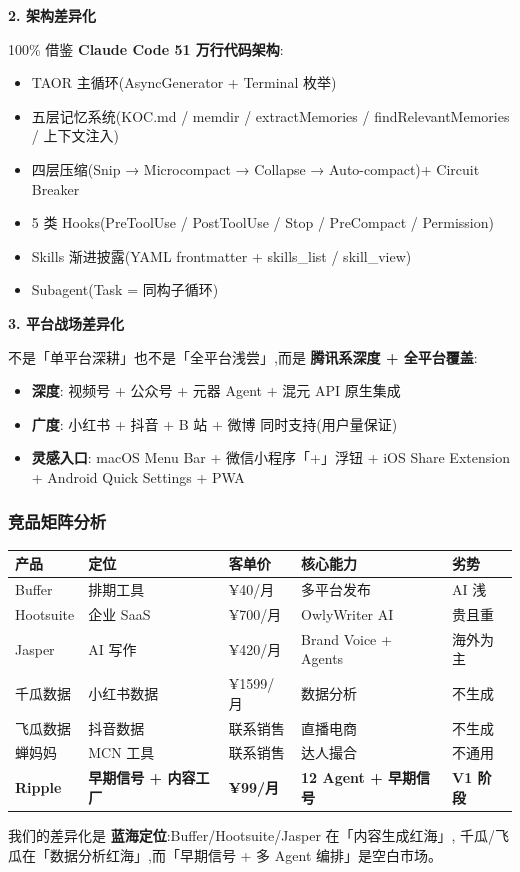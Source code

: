 \textbf{2. 架构差异化}

100\% 借鉴 \textbf{Claude Code 51 万行代码架构}:
\begin{itemize}
\item TAOR 主循环(AsyncGenerator + Terminal 枚举)
\item 五层记忆系统(KOC.md / memdir / extractMemories / findRelevantMemories / 上下文注入)
\item 四层压缩(Snip → Microcompact → Collapse → Auto-compact)+ Circuit Breaker
\item 5 类 Hooks(PreToolUse / PostToolUse / Stop / PreCompact / Permission)
\item Skills 渐进披露(YAML frontmatter + skills\_list / skill\_view)
\item Subagent(Task = 同构子循环)
\end{itemize}

\textbf{3. 平台战场差异化}

不是「单平台深耕」也不是「全平台浅尝」,而是 \textbf{腾讯系深度 + 全平台覆盖}:
\begin{itemize}
\item \textbf{深度}: 视频号 + 公众号 + 元器 Agent + 混元 API 原生集成
\item \textbf{广度}: 小红书 + 抖音 + B 站 + 微博 同时支持(用户量保证)
\item \textbf{灵感入口}: macOS Menu Bar + 微信小程序「+」浮钮 + iOS Share Extension + Android Quick Settings + PWA
\end{itemize}

\subsubsection{竞品矩阵分析}

\begin{tabularx}{\textwidth}{lXXXX}
\toprule
\textbf{产品} & \textbf{定位} & \textbf{客单价} & \textbf{核心能力} & \textbf{劣势} \\
\midrule
Buffer & 排期工具 & ¥40/月 & 多平台发布 & AI 浅 \\
Hootsuite & 企业 SaaS & ¥700/月 & OwlyWriter AI & 贵且重 \\
Jasper & AI 写作 & ¥420/月 & Brand Voice + Agents & 海外为主 \\
千瓜数据 & 小红书数据 & ¥1599/月 & 数据分析 & 不生成 \\
飞瓜数据 & 抖音数据 & 联系销售 & 直播电商 & 不生成 \\
蝉妈妈 & MCN 工具 & 联系销售 & 达人撮合 & 不通用 \\
\midrule
\textbf{Ripple} & \textbf{早期信号 + 内容工厂} & \textbf{¥99/月} & \textbf{12 Agent + 早期信号} & \textbf{V1 阶段} \\
\bottomrule
\end{tabularx}

我们的差异化是 \textbf{蓝海定位}:Buffer/Hootsuite/Jasper 在「内容生成红海」,
千瓜/飞瓜在「数据分析红海」,而「早期信号 + 多 Agent 编排」是空白市场。
